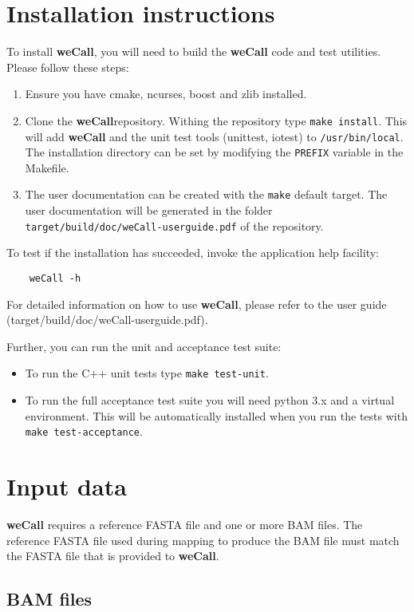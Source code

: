 \documentclass{article}
\newcommand{\wecallproduct}{\textbf{weCall}}
\begin{document}
\section{Installation instructions}

To install {\wecallproduct}, you will need to build the {\wecallproduct} code and test utilities. Please follow these steps:
\begin{enumerate}
    \item Ensure you have cmake, ncurses, boost and zlib installed.
    \item Clone the \wecallproduct repository. Withing the repository type \verb|make install|. This will add {\wecallproduct} and the unit test tools (unittest, iotest) to \verb|/usr/bin/local|. The installation directory can be set by modifying the \verb|PREFIX| variable in the Makefile.
    \item The user documentation can be created with the \verb|make| default target. The user documentation will be generated in the folder \verb|target/build/doc/weCall-userguide.pdf| of the repository.
\end{enumerate}

To test if the installation has succeeded, invoke the application help facility:
\begin{lstlisting}
    weCall -h
\end{lstlisting}
For detailed information on how to use \wecallproduct, please refer to the user guide (target/build/doc/weCall-userguide.pdf).

Further, you can run the unit and acceptance test suite:
\begin{itemize}
    \item To run the C++ unit tests type \verb|make test-unit|.
    \item To run the full acceptance test suite you will need python 3.x and a virtual environment. This will be automatically installed when you run the tests with \verb|make test-acceptance|.
\end{itemize}

\section{Input data}
{\wecallproduct} requires a reference FASTA file and one or more BAM files. The reference FASTA file used during mapping to produce the BAM file must match the
FASTA file that is provided to \wecallproduct.


\subsection{BAM files}
\end{document}
